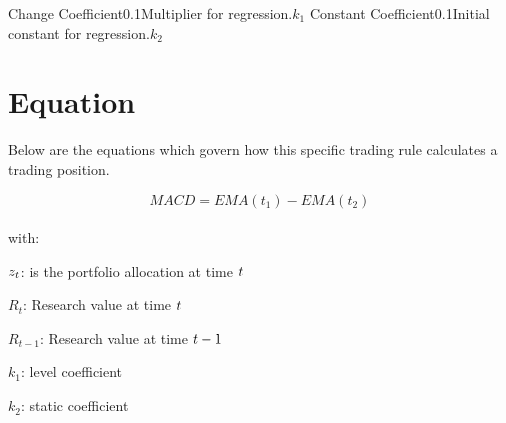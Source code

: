 \documentclass{article}
\begin{document}
\logo
{} %
\tblofcontents


\howtotrade
{}

{Change Coefficient}{0.1}{Multiplier for regression.}{$k_1$}
{Constant Coefficient}{0.1}{Initial constant for regression.}{$k_2$}
\stoptable %

\section{Equation}
Below are the equations which govern how this specific trading rule calculates a trading position.

\begin{equation}
MACD = EMA(t_{1}) - EMA(t_{2})
\end{equation}
\\ %
with:

$z_t$: is the portfolio allocation at time $t$

$R_t$: Research value at time $t$

$R_{t-1}$: Research value at time $t -1$

$k_1$: level coefficient

$k_2$: static coefficient

\keyterms
\furtherlinks %
\end{document}
